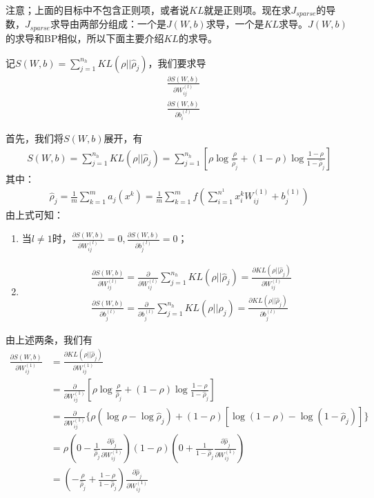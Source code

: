         注意；上面的目标中不包含正则项，或者说$KL$就是正则项。现在求$J_{sparse}$的导数，$J_{sparse}$求导由两部分组成：一个是$J(W,b)$求导，一个是$KL$求导。$J(W,b)$的求导和BP相似，所以下面主要介绍$KL$的求导。
        \par
        记$S(W,b) = \sum_{j=1}^{n_h}KL(\rho||\hat{\rho}_j)$，我们要求导
        \begin{align*}
        & \frac{\partial S(W,b)}{\partial W_{ij}^{(l)}}\\
        & \frac{\partial S(W,b)}{\partial b_i^{(l)}}
        \end{align*}
        \par
        首先，我们将$S(W,b)$展开，有
        \begin{align*}
        S(W,b) = \sum_{j=1}^{n_h}KL(\rho||\hat{\rho}_j) =\sum_{j=1}^{n_h} \left[ \rho\log\frac{\rho}{\hat{\rho}_j}+ (1-\rho)\log\frac{1-\rho}{1-\hat{\rho}_j}  \right]
        \end{align*}
        其中：
        \begin{align*}
        \hat{\rho}_j = \frac{1}{m} \sum_{k=1}^m a_j(x^k) = \frac{1}{m}\sum_{k=1}^m f \left( \sum_{i=1}^{n^1}x^k_i W_{ij}^{(1)}  + b_j^{(1)}\right)
        \end{align*}
        由上式可知：
        \begin{enumerate}
        \item 当$l \neq 1$时，$\frac{\partial S(W,b)}{\partial W_{ij}^{(l)}} = 0
        ,\frac{\partial S(W,b)}{\partial b_j^{(l)}}=0$；
        \item
        \begin{align*}
        & \frac{\partial S(W,b)}{\partial W_{ij}^{(l)}} = \frac{\partial }{\partial W_{ij}^{(l)}}\sum\limits_{j=1}^{n_h} KL(\rho||\hat{\rho}_j) = \frac{\partial KL(\rho||\hat{\rho}_j)}{\partial W_{ij}^{(l)}}\\
        & \frac{\partial S(W,b)}{\partial b_j^{(l)}} = \frac{\partial }{\partial b_j^{(l)}}\sum\limits_{j=1}^{n_h} KL(\rho||\hat{\rho}_j) = \frac{\partial KL(\rho||\hat{\rho}_j)}{\partial b_j^{(l)}}
        \end{align*}
        \end{enumerate}
        由上述两条，我们有
        \begin{align*}
        \frac{\partial S(W,b)}{\partial W_{ij}^{(1)}} & = \frac{\partial KL(\rho||\hat{\rho}_j)}{\partial W_{ij}^{(1)}}\\
        & = \frac{\partial }{\partial W_{ij}^{(1)}} \left[ \rho\log\frac{\rho}{\hat{\rho}_j}+ (1-\rho)\log\frac{1-\rho}{1-\hat{\rho}_j}  \right]\\
        &= \frac{\partial }{\partial W_{ij}^{(1)}} \Big\{ \rho(\log\rho - \log \hat{\rho}_j) + (1-\rho)[\log(1-\rho) -\log(1-\hat{\rho}_j)  ]  \Big\}\\
        &= \rho \left( 0- \frac{1}{\hat{\rho}_j} \frac{\partial \hat{\rho}_j}{\partial W_{ij}^{(1)}} \right) (1-\rho) \left( 0+\frac{1}{1-\hat{\rho}_j}\frac{\partial \hat{\rho}_j}{\partial W_{ij}^{(1)}} \right) \\
        &= \left( -\frac{\rho}{\hat{\rho}_j }+ \frac{1-\rho}{1-\hat{\rho}_j} \right) \frac{\partial \hat{\rho}_j}{\partial W_{ij}^{(1)}}
        \end{align*}
